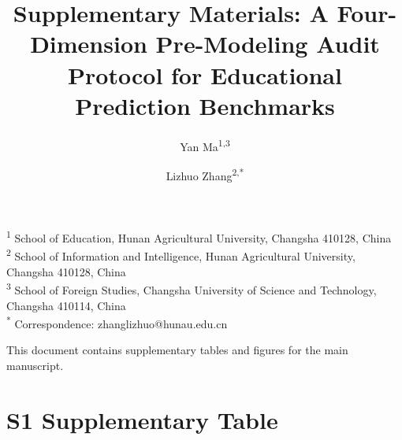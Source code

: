 \documentclass[10pt,letterpaper]{article}
\title{\vspace*{-0.8in}\Large\textbf{Supplementary Materials: A Four-Dimension Pre-Modeling Audit Protocol for Educational Prediction Benchmarks}}
\author{Yan Ma\textsuperscript{1,3} \and Lizhuo Zhang\textsuperscript{2,*}}
\date{}
\begin{document}
\maketitle
\vspace{-0.4in}
\noindent\textsuperscript{1} School of Education, Hunan Agricultural University, Changsha 410128, China\\
\textsuperscript{2} School of Information and Intelligence, Hunan Agricultural University, Changsha 410128, China\\
\textsuperscript{3} School of Foreign Studies, Changsha University of Science and Technology, Changsha 410114, China\\
\textsuperscript{*} Correspondence: zhanglizhuo@hunau.edu.cn

\vspace{0.2in}

This document contains supplementary tables and figures for the main manuscript.

\section*{S1 Supplementary Table}
\end{document}
